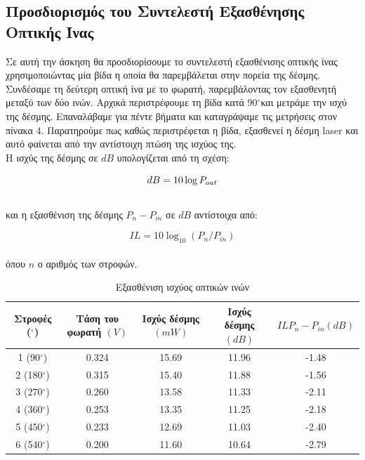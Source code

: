 \documentclass[a4paper,11pt,titlepage]{article}
\newcommand{\degrees}{\ensuremath{^\circ}}
\begin{document}
\subsection{Προσδιορισμός του Συντελεστή Εξασθένησης Οπτικής Ίνας}%

Σε αυτή την άσκηση θα προσδιορίσουμε το συντελεστή εξασθένισης οπτικής ίνας χρησιμοποιώντας μία βίδα η οποία θα παρεμβάλεται στην πορεία της δέσμης.\\
Συνδέσαμε τη δεύτερη οπτική ίνα με το φωρατή, παρεμβάλοντας τον εξασθενητή μεταξύ των δύο ινών.  Αρχικά περιστρέφουμε τη βίδα κατά 90\degrees και μετράμε την ισχύ της δέσμης. Επαναλάβαμε για πέντε βήματα και καταγράψαμε τις μετρήσεις στον πίνακα 4. Παρατηρούμε πως καθώς περιστρέφεται η βίδα, εξασθενεί η δέσμη laser και αυτό φαίνεται από την αντίστοιχη πτώση της ισχύος της. \\
Η ισχύς της δέσμης σε $dB$ υπολογίζεται από τη σχέση:

\begin{equation}
dB=10\log{P_{out}}\\
\end{equation}
\\

και η εξασθένιση της δέσμης $P_{n}-P_{in}$ σε $dB$ αντίστοιχα από:

\begin{equation}
IL=10 \log_{10} (P_{n}/P_{in})
\end{equation}\\

όπου $n$ ο αριθμός των στροφών.

\newpage

\begin{table} [bph!]
\centering
\begin{tabular}{|c|c|c|c|c|}
\hline \rule[-2ex]{0pt}{5.5ex}	Στροφές (\degrees)	& Τάση του φωρατή $(V)$ 	& Ισχύς δέσμης $(mW)$ & 	Ισχύς δέσμης $(dB)$ & $IL	P_{n}-P_{in} (dB)$ 	\\ 
\hline \rule[-2ex]{0pt}{5.5ex} 1	(90\degrees)	&	0.324 	&	15.69	&	11.96	&	-1.48	\\ 
\hline \rule[-2ex]{0pt}{5.5ex} 2	(180\degrees)	&	0.315	&	15.40	&	11.88	&	-1.56	\\ 
\hline \rule[-2ex]{0pt}{5.5ex} 3 	(270\degrees)	&	0.260 	&	13.58	&	11.33	&	-2.11	\\ 
\hline \rule[-2ex]{0pt}{5.5ex} 4	(360\degrees)	&	0.253 	&	13.35	&	11.25	&	-2.18	\\ 
\hline \rule[-2ex]{0pt}{5.5ex} 5	(450\degrees)	&	0.233 	&	12.69	&	11.03	&	-2.40	\\
\hline \rule[-2ex]{0pt}{5.5ex} 6	(540\degrees)	&	0.200	&	11.60	&	10.64	&	-2.79	\\  
\hline 
\end{tabular} 
\caption{Εξασθένιση ισχύος οπτικών ινών}
\end{table}
\end{document}
